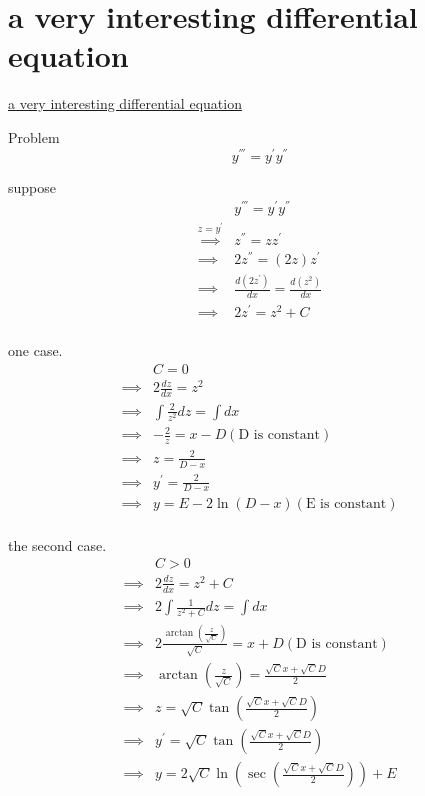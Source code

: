 \documentclass {article}
\begin{document}
\section{a very interesting differential equation}
\href{https://www.youtube.com/watch?v=tr7NZ71LFKA}{a very interesting differential equation}


Problem  \[ y^{'''} = y^{'}y^{''}\]

suppose
\[
\begin{matrix}
    & y^{'''}  = y^{'}y^{''} \\
     \stackrel {z = y^{'}}{\implies} & z^{''} = z z^{'} \\
     \implies & 2z^{''} = \left(2z\right)z^{'} \\
     \implies & \frac{{d}\left(2z^{'}\right)}{{d}x} = \frac {{d}\left(z^{2}\right)} {{d}x}  \\
     \implies & 2z^{'} = z^{2} + C \\
\end{matrix}
\]


one case.
\[
\begin{matrix}
 & C = 0 \\
\implies & 2 \frac {{d}z} {{d}x} = z ^{2} \\
\implies & \int \frac {2}{z^2} {d}z = \int {d}x \\
\implies & -\frac{2}{z} = x - D  \left(\text{D is constant}\right)\\
\implies & z =  \frac{2}{D -x} \\
\implies & y^{'} = \frac{2}{D -x } \\
\implies & y = E - 2\ln\left(D-x\right) (\text{E is constant}) \\
\end{matrix}
\]

the second case.
\[
\begin{matrix}
 & C > 0 \\
\implies & 2 \frac {{d}z} {{d}x} = z^{2} + C \\
\implies & 2 \int \frac{1}{z^{2} + C} {d}z = \int {d}x \\
\implies & 2\frac {\arctan\left( \frac {z}{\sqrt{C}} \right)} {\sqrt{C}} = x + D \left(\text{D is constant}\right) \\
\implies & \arctan\left(\frac {z} {\sqrt{C} }  \right) = \frac {\sqrt{C}x + \sqrt{C}D}{2} \\
\implies & z = \sqrt{C}\tan\left( \frac {\sqrt{C}x + \sqrt{C}D}{2} \right) \\
\implies & y^{'}= \sqrt{C}\tan\left( \frac {\sqrt{C}x + \sqrt{C}D}{2} \right) \\
\implies & y = 2\sqrt{C} \ln\left(\sec\left(\frac{\sqrt{C}x + \sqrt{C}D}{2}\right)\right) + E \\
\end{matrix}
\]
\end{document}

